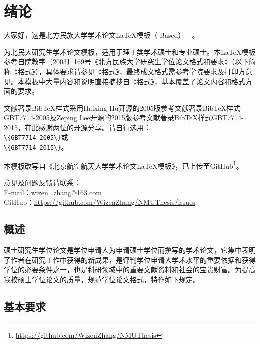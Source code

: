 \chapter{绪论}
大家好，这是北方民族大学学术论文\LaTeX{}模板（\CTeX{}-Based）---\NMUThesis{}。

\NMUThesis{}为北民大研究生学术论文模板，适用于理工类学术硕士和专业硕士。本\LaTeX{}模板参考自院教字〔2003〕169号《北方民族大学研究生学位论文格式和要求》（以下简称《格式》），具体要求请参见《格式》，最终成文格式需参考学院要求及打印方意见。本模板中大量内容和说明直接摘抄自《格式》，基本覆盖了论文内容和格式方面的要求。

文献著录BibTeX样式采用Haixing Hu开源的2005版参考文献著录BibTeX样式\href{https://github.com/Haixing-Hu/GBT7714-2005-BibTeX-Style}{GBT7714-2005}及Zeping Lee开源的2015版参考文献著录BibTeX样式\href{https://github.com/zepinglee/gbt7714-bibtex-style}{GBT7714-2015}，在此感谢两位的开源分享。请自行选用：\\
\verb|\{GBT7714-2005\}|或\\
\verb|\{GBT7714-2015\}|。

本模板改写自《北京航空航天大学学术论文LaTeX模板》，已上传至GitHub\footnote{\href{https://github.com/WizenZhang/NMUThesis}{https://github.com/WizenZhang/NMUThesis}}。

意见及问题反馈请联系：\\
\indent E-mail：wizen\_zhang@163.com\\
\indent GitHub：\href{https://github.com/WizenZhang/NMUThesis/issues}{https://github.com/WizenZhang/NMUThesis/issues}

\section{概述}
硕士研究生学位论文是学位申请人为申请硕士学位而撰写的学术论文，它集中表明了作者在研究工作中获得的新成果，是评判学位申请人学术水平的重要依据和获得学位的必要条件之一，也是科研领域中的重要文献资料和社会的宝贵财富。为提高我校硕士学位论文的质量，规范学位论文格式，特作如下规定。

\section{基本要求}

